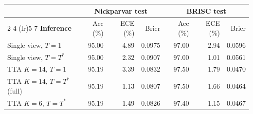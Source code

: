 \begin{tabular}{l r r r r r r }
\toprule
 & \multicolumn{3}{c}{\textbf{Nickparvar test}} & \multicolumn{3}{c}{\textbf{BRISC test}} \\
\cmidrule(lr){2-4} \cmidrule(lr){5-7}
\textbf{Inference} & Acc (\%) & ECE (\%) & Brier & Acc (\%) & ECE (\%) & Brier \\
\midrule
Single view, $T=1$ & 95.00 & 4.89 & 0.0975 & 97.00 & 2.94 & 0.0596 \\
Single view, $T=T^{*}$ & 95.00 & 2.32 & 0.0907 & 97.00 & 1.01 & 0.0561 \\
TTA $K{=}14$, $T=1$ & 95.19 & 3.39 & 0.0832 & 97.50 & 1.79 & 0.0470 \\
TTA $K{=}14$, $T=T^{*}$ (full) & 95.19 & 1.13 & 0.0807 & 97.50 & 1.66 & 0.0464 \\
TTA $K{=}6$, $T=T^{*}$ & 95.19 & 1.49 & 0.0826 & 97.40 & 1.15 & 0.0467 \\
\bottomrule
\end{tabular}
